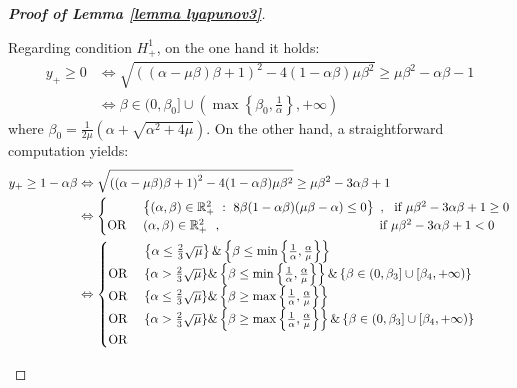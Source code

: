 \documentclass[reqno]{amsart}
\theoremstyle{plain}
\theoremstyle{definition}
\theoremstyle{remark}
\newcommand{\R}{\mathbb{R}}	%
\begin{document}
\begin{proof}[\textbf{Proof of Lemma \ref{lemma lyapunov3}}]
\begin{itemize}[wide=0pt]
\begin{itemize}[wide=5pt]
			Regarding condition $H_{+}^{1}$, on the one hand it holds:
			\begin{equation}\label{ypositive1}
				\begin{aligned}
					y_{+}\geq 0 &\Leftrightarrow		\sqrt{\left((\alpha-\mu\beta)\beta+1\right)^2 - 4(1-\alpha\beta)\mu\beta^2} \geq \mu\beta^{2}-\alpha\beta-1	\\
					& \Leftrightarrow 
					\beta \in (0,\beta_{0}]\cup \left(\max\left\{\beta_{0},\frac{1}{\alpha}\right\},+\infty\right) 
				\end{aligned}
			\end{equation}
			where $\beta_{0}=\frac{1}{2\mu}\left(\alpha+\sqrt{\alpha^{2}+4\mu}\right)$. On the other hand, a straightforward computation yields:
			\begin{equation}\label{ygeq1minab}
				\begin{aligned}
					y_{+}  \geq 1-\alpha\beta & \Leftrightarrow		\sqrt{\left((\alpha-\mu\beta)\beta+1\right)^2 - 4(1-\alpha\beta)\mu\beta^2} \geq \mu\beta^{2}-3\alpha\beta+1	\\
					& \Leftrightarrow \begin{cases}
						& \left\{(\alpha,\beta)\in\R_{+}^{2} ~:~  8\beta(1-\alpha\beta)(\mu\beta-\alpha)\leq 0\right\} ~ , ~ \text{ if } \mu\beta^{2}-3\alpha\beta +1 \geq 0 \\
						\text{OR }	 &(\alpha,\beta)\in \R_{+}^{2} ~ ~ , \hspace{4.3cm}  \text{ if } \mu\beta^{2}-3\alpha\beta +1 < 0
					\end{cases}\\
					& \Leftrightarrow\begin{cases}
						& \left\{\alpha\leq \frac{2}{3}\sqrt{\mu}\right\}\&\left\{\beta\leq \min\left\{\frac{1}{\alpha}, \frac{\alpha}{\mu}\right\}\right\} \\
						\text{OR } &
						\{\alpha > \frac{2}{3}\sqrt{\mu}\}\&\left\{\beta\leq \min\left\{\frac{1}{\alpha}, \frac{\alpha}{\mu}\right\}\right\} \& \left\{\beta\in (0,\beta_{3}]\cup[\beta_{4},+\infty)\right\}   \\
						\text{OR } &
						\{\alpha \leq \frac{2}{3}\sqrt{\mu}\}\&\left\{\beta\geq \max\left\{\frac{1}{\alpha}, \frac{\alpha}{\mu}\right\}\right\}   \\
						\text{OR } &
						\{\alpha > \frac{2}{3}\sqrt{\mu}\}\&\left\{\beta\geq \max\left\{\frac{1}{\alpha}, \frac{\alpha}{\mu}\right\}\right\} \& \left\{\beta\in (0,\beta_{3}]\cup[\beta_{4},+\infty)\right\}   \\
						\text{OR } &

\end{cases}
\end{aligned}
\end{equation}
\end{itemize}
\end{itemize}
\end{proof}
\end{document}
